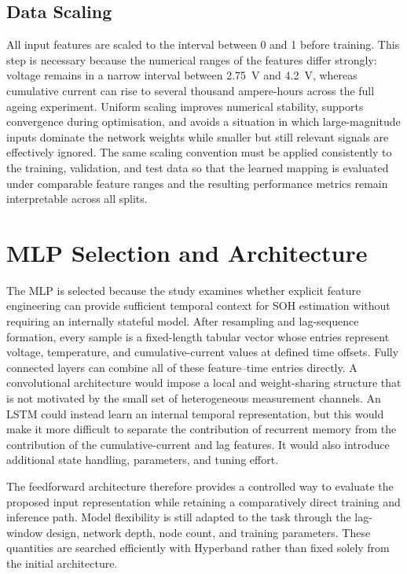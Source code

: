 \documentclass[
    a4paper,
    12pt,
    titlepage,
    bibliography=totoc,
    twoside=on,
    parskip=false,
    numbers=noenddot,
    cleardoublepage=empty,
    DIV=12,
    BCOR=12.0mm,
    headheight=36pt,
    headings=openright
]{scrreprt}
\begin{document}
\subsection{Data Scaling}
All input features are scaled to the interval between 0 and 1 before training.\autocite{salimansWeightNormalizationSimple2016} This step is necessary because the numerical ranges of the features differ strongly: voltage remains in a narrow interval between \SI{2.75}{\volt} and \SI{4.2}{\volt}, whereas cumulative current can rise to several thousand ampere-hours across the full ageing experiment. Uniform scaling improves numerical stability, supports convergence during optimisation, and avoids a situation in which large-magnitude inputs dominate the network weights while smaller but still relevant signals are effectively ignored.\autocite{salimansWeightNormalizationSimple2016} The same scaling convention must be applied consistently to the training, validation, and test data so that the learned mapping is evaluated under comparable feature ranges and the resulting performance metrics remain interpretable across all splits.

\section{MLP Selection and Architecture}
The MLP is selected because the study examines whether explicit feature engineering can provide sufficient temporal context for SOH estimation without requiring an internally stateful model. After resampling and lag-sequence formation, every sample is a fixed-length tabular vector whose entries represent voltage, temperature, and cumulative-current values at defined time offsets. Fully connected layers can combine all of these feature--time entries directly. A convolutional architecture would impose a local and weight-sharing structure that is not motivated by the small set of heterogeneous measurement channels. An LSTM could instead learn an internal temporal representation, but this would make it more difficult to separate the contribution of recurrent memory from the contribution of the cumulative-current and lag features. It would also introduce additional state handling, parameters, and tuning effort.\autocite{weytjensCashFlowPrediction2021}

The feedforward architecture therefore provides a controlled way to evaluate the proposed input representation while retaining a comparatively direct training and inference path. Model flexibility is still adapted to the task through the lag-window design, network depth, node count, and training parameters. These quantities are searched efficiently with Hyperband rather than fixed solely from the initial architecture.\autocite{liHyperbandNovelBanditBased2016}
\end{document}
